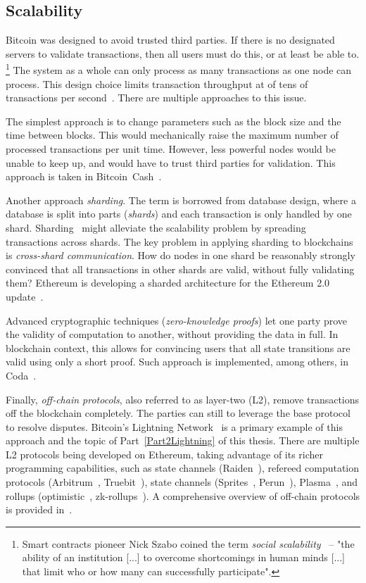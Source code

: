 \subsection{Scalability}

Bitcoin was designed to avoid trusted third parties.
If there is no designated servers to validate transactions, then all users must do this, or at least be able to.
\footnote{Smart contracts pioneer Nick Szabo coined the term \textit{social scalability}~\cite{Szabo2017} -- "the ability of an institution [...] to overcome shortcomings in human minds [...] that limit who or how many can successfully participate".}
The system as a whole can only process as many transactions as one node can process.
This design choice limits transaction throughput at of tens of transactions per second~\cite{Croman2016}.
There are multiple approaches to this issue.

The simplest approach is to change parameters such as the block size and the time between blocks.
This would mechanically raise the maximum number of processed transactions per unit time.
However, less powerful nodes would be unable to keep up, and would have to trust third parties for validation.
This approach is taken in Bitcoin~Cash~\cite{Kwon2019}.

Another approach \textit{sharding}.
The term is borrowed from database design, where a database is split into parts (\textit{shards}) and each transaction is only handled by one shard.
Sharding~\cite{Gencer2016, Luu2016a} might alleviate the scalability problem by spreading transactions across shards.
The key problem in applying sharding to blockchains is \textit{cross-shard communication}.
How do nodes in one shard be reasonably strongly convinced that all transactions in other shards are valid, without fully validating them?
Ethereum is developing a sharded architecture for the Ethereum 2.0 update~\cite{ShardingFAQ}.

Advanced cryptographic techniques (\textit{zero-knowledge proofs}) let one party prove the validity of computation to another, without providing the data in full.
In blockchain context, this allows for convincing users that all state transitions are valid using only a short proof.
Such approach is implemented, among others, in Coda~\cite{Bonneau2020}.

Finally, \textit{off-chain protocols}, also referred to as layer-two (L2), remove transactions off the blockchain completely.
The parties can still to leverage the base protocol to resolve disputes.
Bitcoin's Lightning Network~\cite{Poon2016} is a primary example of this approach and the topic of Part~\ref{Part2Lightning} of this thesis.
There are multiple L2 protocols being developed on Ethereum, taking advantage of its richer programming capabilities, such as state channels (Raiden~\cite{RaidenWebsite}), refereed computation protocols (Arbitrum~\cite{Kalodner2018}, Truebit~\cite{Teutsch2017}), state channels (Sprites~\cite{Miller2019}, Perun~\cite{Dziembowski2017}), Plasma~\cite{Poon2017}, and rollups (optimistic~\cite{Floersch2019}, zk-rollups~\cite{Gluchowski2019}).
A comprehensive overview of off-chain protocols is provided in~\cite{Gudgeon2019}.



